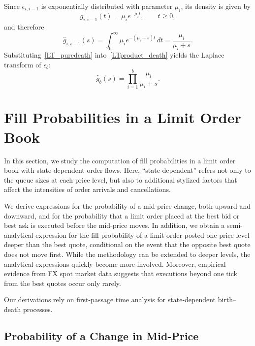 \documentclass[11pt]{article}
\begin{document}
Since $\epsilon_{i,i-1}$ is exponentially distributed with parameter $\mu_i$, its density is given by
\[
g_{i,i-1}(t)=\mu_i e^{-\mu_i t},
\qquad t\geq 0,
\]
and therefore
\begin{equation}\label{LT_puredeath}
\hat{g}_{i,i-1}(s)
=
\int_0^\infty \mu_i e^{-(\mu_i+s)t}\,dt
=
\frac{\mu_i}{\mu_i+s}.
\end{equation}
Substituting~\eqref{LT_puredeath} into~\eqref{LTproduct_death} yields the Laplace transform of $\epsilon_b$:
\begin{equation}\label{productdeath}
\hat{g}_b(s)
=
\prod_{i=1}^b \frac{\mu_i}{\mu_i+s}.
\end{equation}

\section{Fill Probabilities in a Limit Order Book}\label{Ch: FillProbTheory}
In this section, we study the computation of fill probabilities in a limit order book with state-dependent order flows. Here, ``state-dependent'' refers not only to the queue sizes at each price level, but also to additional stylized factors that affect the intensities of order arrivals and cancellations.

We derive expressions for the probability of a mid-price change, both upward and downward, and for the probability that a limit order placed at the best bid or best ask is executed before the mid-price moves. In addition, we obtain a semi-analytical expression for the fill probability of a limit order posted one price level deeper than the best quote, conditional on the event that the opposite best quote does not move first. While the methodology can be extended to deeper levels, the analytical expressions quickly become more involved. Moreover, empirical evidence from FX spot market data suggests that executions beyond one tick from the best quotes occur only rarely.

Our derivations rely on first-passage time analysis for state-dependent birth--death processes.

\subsection{Probability of a Change in Mid-Price}\label{sec:pricemove_theory}
\end{document}

